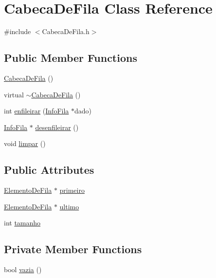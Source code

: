 \hypertarget{classCabecaDeFila}{
\section{CabecaDeFila Class Reference}
\label{classCabecaDeFila}
}


{\ttfamily \#include $<$CabecaDeFila.h$>$}

\subsection*{Public Member Functions}
\begin{DoxyCompactItemize}
\item 
\hyperlink{classCabecaDeFila_aedb7917f5b1830826612196b7d4f0e35}{CabecaDeFila} ()
\item 
virtual \hyperlink{classCabecaDeFila_a9901d8072c4f916afd5103d9043dda7b}{$\sim$CabecaDeFila} ()
\item 
int \hyperlink{classCabecaDeFila_afd99e5b88ecb1f58dee6aca2f83124e7}{enfileirar} (\hyperlink{classInfoFila}{InfoFila} $\ast$dado)
\item 
\hyperlink{classInfoFila}{InfoFila} $\ast$ \hyperlink{classCabecaDeFila_a58364e4456bd9a7696fa6cce8713abd7}{desenfileirar} ()
\item 
void \hyperlink{classCabecaDeFila_ad849760dd955385f04bc92594295848e}{limpar} ()
\end{DoxyCompactItemize}
\subsection*{Public Attributes}
\begin{DoxyCompactItemize}
\item 
\hyperlink{classElementoDeFila}{ElementoDeFila} $\ast$ \hyperlink{classCabecaDeFila_a0ba2e2fd8b989285a492a3a9d5716e00}{primeiro}
\item 
\hyperlink{classElementoDeFila}{ElementoDeFila} $\ast$ \hyperlink{classCabecaDeFila_a5446294afc8bbc810363751e83fef53d}{ultimo}
\item 
int \hyperlink{classCabecaDeFila_a71496e069a5e360d24b91e8600a360bc}{tamanho}
\end{DoxyCompactItemize}
\subsection*{Private Member Functions}
\begin{DoxyCompactItemize}
\item 
bool \hyperlink{classCabecaDeFila_a496b0bbb3f704774f1462bcde385d644}{vazia} ()
\end{DoxyCompactItemize}


